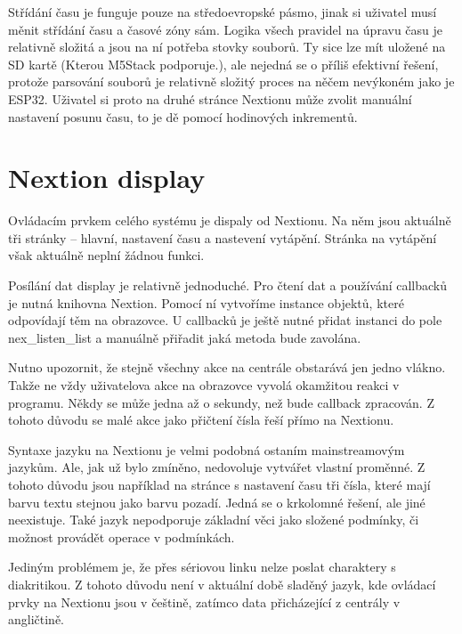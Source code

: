 \documentclass[a4paper,oneside,12pt]{report}
\begin{document}
Střídání času je funguje pouze na středoevropské pásmo, jinak si uživatel musí měnit střídání času a časové zóny sám.
Logika všech pravidel na úpravu času je relativně složitá a jsou na ní potřeba stovky souborů.
Ty sice lze mít uložené na SD kartě (Kterou M5Stack podporuje.), ale nejedná se o příliš efektivní řešení, protože parsování souborů je relativně složitý proces na něčem nevýkoném jako je ESP32.
Uživatel si proto na druhé stránce Nextionu může zvolit manuální nastavení posunu času, to je dě pomocí hodinových inkrementů.

\section{Nextion display}

Ovládacím prvkem celého systému je dispaly od Nextionu.
Na něm jsou aktuálně tři stránky -- hlavní, nastavení času a nastevení vytápění.
Stránka na vytápění však aktuálně neplní žádnou funkci.

Posílání dat display je relativně jednoduché.
Pro čtení dat a používání callbacků je nutná knihovna Nextion.
Pomocí ní vytvoříme instance objektů, které odpovídají těm na obrazovce.
U callbacků je ještě nutné přidat instanci do pole nex\_listen\_list a manuálně přiřadit jaká metoda bude zavolána.

Nutno upozornit, že stejně všechny akce na centrále obstarává jen jedno vlákno.
Takže ne vždy uživatelova akce na obrazovce vyvolá okamžitou reakci v programu.
Někdy se může jedna až o sekundy, než bude callback zpracován.
Z tohoto důvodu se malé akce jako přičtení čísla řeší přímo na Nextionu.

Syntaxe jazyku na Nextionu je velmi podobná ostaním mainstreamovým jazykům.
Ale, jak už bylo zmíněno, nedovoluje vytvářet vlastní proměnné.
Z tohoto důvodu jsou například na stránce s nastavení času tři čísla, které mají barvu textu stejnou jako barvu pozadí.
Jedná se o krkolomné řešení, ale jiné neexistuje.
Také jazyk nepodporuje základní věci jako složené podmínky, či možnost provádět operace v podmínkách.

Jediným problémem je, že přes sériovou linku nelze poslat charaktery s diakritikou.
Z tohoto důvodu není v aktuální době sladěný jazyk, kde ovládací prvky na Nextionu jsou v češtině, zatímco data přicházející z centrály v angličtině.

\end{document}

